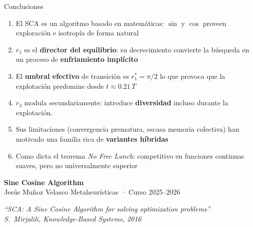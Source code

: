 \documentclass[aspectratio=169, spanish]{beamer}
\newcommand{\hl} [1]{\textcolor{myblue}  {\textbf{#1}}}
\begin{document}
\begin{frame}{Conclusiones}
  \begin{enumerate}
    \setlength\itemsep{0.42em}
    \item El SCA es un algoritmo basado en matemáticas: $\sin$ y $\cos$ proveen exploración e isotropía de forma natural
    \item \hl{$r_1$} es el \textbf{director del equilibrio}: su decrecimiento convierte la búsqueda en un proceso de \textbf{enfriamiento implícito}
    \item El \textbf{umbral efectivo} de transición es $r_1^* = \pi/2$ lo que provoca que la explotación predomine desde $t \approx 0.21\,T$
    \item \hl{$r_3$} modula secundariamente: introduce \textbf{diversidad} incluso durante la explotación.
    \item Sus limitaciones (convergencia prematura, escasa memoria colectiva) han motivado una familia rica de \textbf{variantes híbridas}
    \item Como dicta el teorema \textit{No Free Lunch}: competitivo en funciones continuas suaves, pero no universalmente superior
  \end{enumerate}
\end{frame}

{
\begin{frame}[plain]
  \vspace{1.8em}
  \begin{center}
    {\Large\bfseries\color{white} Sine Cosine Algorithm}\\[0.4em]
    {\color{white!70} Jesús Muñoz Velasco \quad\textbullet\quad Metaheurísticas · Curso 2025--2026}

    \vspace{1.8em}

    \vspace{0.8em}
    {\small\color{white!60}\itshape
      ``SCA: A Sine Cosine Algorithm for solving optimization problems''\\
      S.~Mirjalili, Knowledge-Based Systems, 2016}
  \end{center}
\end{frame}
}
\end{document}

